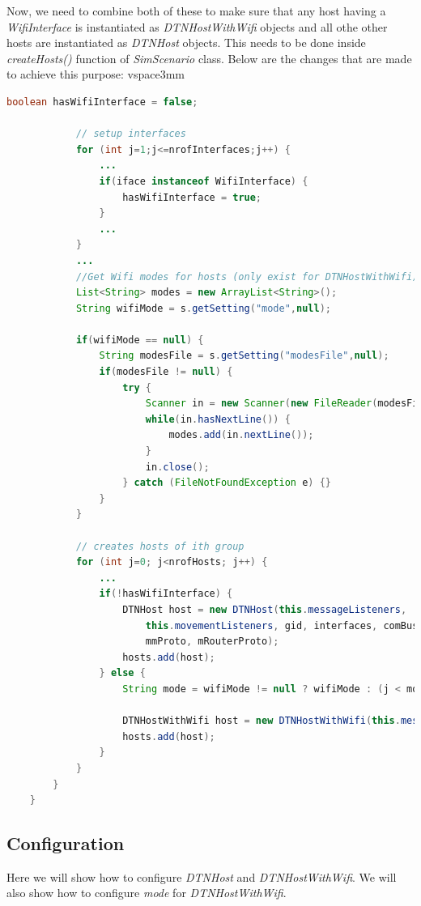 Now, we need to combine both of these to make sure that any host having a \textit{WifiInterface} is instantiated as \textit{DTNHostWithWifi} objects and all othe other hosts are instantiated as \textit{DTNHost} objects. This needs to be done inside \textit{createHosts()} function of \textit{SimScenario} class. Below are the changes that are made to achieve this purpose:
vspace{3mm}
\begin{lstlisting}[language=java]
			boolean hasWifiInterface = false;

			// setup interfaces
			for (int j=1;j<=nrofInterfaces;j++) {
				...
				if(iface instanceof WifiInterface) {
					hasWifiInterface = true;
				}
				...
			}
			...
			//Get Wifi modes for hosts (only exist for DTNHostWithWifi)
			List<String> modes = new ArrayList<String>();
			String wifiMode = s.getSetting("mode",null);

			if(wifiMode == null) {
				String modesFile = s.getSetting("modesFile",null);
				if(modesFile != null) {
					try {
						Scanner in = new Scanner(new FileReader(modesFile));
						while(in.hasNextLine()) {
							modes.add(in.nextLine());
						}
						in.close();
					} catch (FileNotFoundException e) {}
				}
			}

			// creates hosts of ith group
			for (int j=0; j<nrofHosts; j++) {
				...
				if(!hasWifiInterface) {
					DTNHost host = new DTNHost(this.messageListeners,
						this.movementListeners,	gid, interfaces, comBus,
						mmProto, mRouterProto);
					hosts.add(host);
				} else {
					String mode = wifiMode != null ? wifiMode : (j < modes.size() ? modes.get(j) : "");

					DTNHostWithWifi host = new DTNHostWithWifi(this.messageListeners, this.movementListeners, gid, interfaces, comBus, mmProto, mRouterProto,  mode: mode);
					hosts.add(host);
				}
			}
		}
	}
\end{lstlisting}
\subsection{Configuration}
Here we will show how to configure \textit{DTNHost} and \textit{DTNHostWithWifi}. We will also show how to configure \textit{mode} for \textit{DTNHostWithWifi}.

